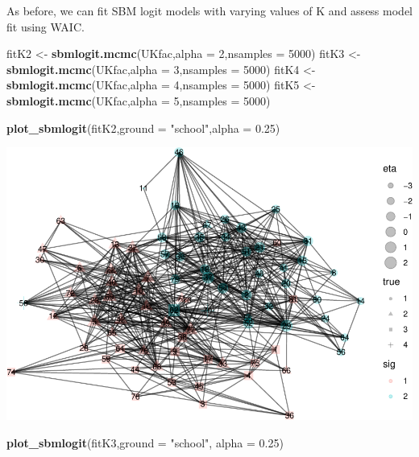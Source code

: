\documentclass[]{article}
\newenvironment{Shaded}{\begin{snugshade}}{\end{snugshade}}
\newcommand{\DataTypeTok}[1]{\textcolor[rgb]{0.13,0.29,0.53}{#1}}
\newcommand{\DecValTok}[1]{\textcolor[rgb]{0.00,0.00,0.81}{#1}}
\newcommand{\FloatTok}[1]{\textcolor[rgb]{0.00,0.00,0.81}{#1}}
\newcommand{\KeywordTok}[1]{\textcolor[rgb]{0.13,0.29,0.53}{\textbf{#1}}}
\newcommand{\NormalTok}[1]{#1}
\newcommand{\StringTok}[1]{\textcolor[rgb]{0.31,0.60,0.02}{#1}}
\begin{document}
As before, we can fit SBM logit models with varying values of K and
assess model fit using WAIC.

\begin{Shaded}
\begin{Highlighting}[]
\NormalTok{fitK2 <-}\StringTok{ }\KeywordTok{sbmlogit.mcmc}\NormalTok{(UKfac,}\DataTypeTok{alpha =} \DecValTok{2}\NormalTok{,}\DataTypeTok{nsamples =} \DecValTok{5000}\NormalTok{)}
\NormalTok{fitK3 <-}\StringTok{ }\KeywordTok{sbmlogit.mcmc}\NormalTok{(UKfac,}\DataTypeTok{alpha =} \DecValTok{3}\NormalTok{,}\DataTypeTok{nsamples =} \DecValTok{5000}\NormalTok{)}
\NormalTok{fitK4 <-}\StringTok{ }\KeywordTok{sbmlogit.mcmc}\NormalTok{(UKfac,}\DataTypeTok{alpha =} \DecValTok{4}\NormalTok{,}\DataTypeTok{nsamples =} \DecValTok{5000}\NormalTok{)}
\NormalTok{fitK5 <-}\StringTok{ }\KeywordTok{sbmlogit.mcmc}\NormalTok{(UKfac,}\DataTypeTok{alpha =} \DecValTok{5}\NormalTok{,}\DataTypeTok{nsamples =} \DecValTok{5000}\NormalTok{)}
\end{Highlighting}
\end{Shaded}

\begin{Shaded}
\begin{Highlighting}[]
\KeywordTok{plot_sbmlogit}\NormalTok{(fitK2,}\DataTypeTok{ground =} \StringTok{"school"}\NormalTok{,}\DataTypeTok{alpha =} \FloatTok{0.25}\NormalTok{)}
\end{Highlighting}
\end{Shaded}

\includegraphics{karate_test_files/figure-latex/unnamed-chunk-18-1.pdf}

\begin{Shaded}
\begin{Highlighting}[]
\KeywordTok{plot_sbmlogit}\NormalTok{(fitK3,}\DataTypeTok{ground =} \StringTok{"school"}\NormalTok{, }\DataTypeTok{alpha =} \FloatTok{0.25}\NormalTok{)}
\end{Highlighting}
\end{Shaded}
\end{document}
